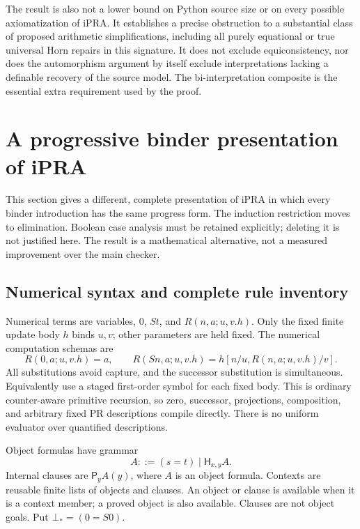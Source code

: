 \documentclass[11pt,letterpaper]{article}
\theoremstyle{definition}\newtheorem{definition}[theorem]{Definition}
\theoremstyle{remark}\newtheorem{remark}[theorem]{Remark}
\begin{document}
The result is also not a lower bound on Python source size or on every
possible axiomatization of iPRA.  It establishes a precise obstruction
to a substantial class of proposed arithmetic simplifications, including
all purely equational or true universal Horn repairs in this signature.
It does not exclude equiconsistency, nor does the automorphism argument
by itself exclude interpretations lacking a definable recovery of the
source model.  The bi-interpretation composite is the essential extra
requirement used by the proof.

\clearpage
\section{A progressive binder presentation of iPRA}
\label{app:progressive-binder}

This section gives a different, complete presentation of iPRA in which
every binder introduction has the same progress form.  The induction
restriction moves to elimination.  Boolean case analysis must be
retained explicitly; deleting it is not justified here.  The result is a
mathematical alternative, not a measured improvement over the main
checker.

\subsection{Numerical syntax and complete rule inventory}

Numerical terms are variables, $0$, $St$, and
$R(n,a;u,v.h)$.  Only the fixed finite update body $h$ binds $u,v$;
other parameters are held fixed.  The numerical computation schemas are
\[
 R(0,a;u,v.h)=a,\qquad
 R(Sn,a;u,v.h)=h[n/u,R(n,a;u,v.h)/v].
 \tag{PR}
\]
All substitutions avoid capture, and the successor substitution is
simultaneous.  Equivalently use a staged first-order symbol for each
fixed body.  This is ordinary counter-aware primitive recursion, so
zero, successor, projections, composition, and arbitrary fixed PR
descriptions compile directly.  There is no uniform evaluator over
quantified descriptions.

Object formulas have grammar
\[
 A::=(s=t)\mid\mathsf H_{x,y}A.
\]
Internal clauses are $\mathsf P_yA(y)$, where $A$ is an object formula.
Contexts are reusable finite lists of objects and clauses.  An object
or clause is available when it is a context member; a proved object is
also available.  Clauses are not object goals.  Put $\bot_*=(0=S0)$.
\end{document}

